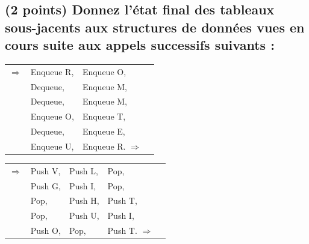 \documentclass[11pt,a4paper]{article}
\begin{document}
\bigskip
\bigskip


\subsection{(2 points) Donnez l'état final des tableaux sous-jacents aux structures de données vues en cours suite aux appels successifs suivants : }


\begin{center}
\begin{table}[ht!]
  \centering
  \begin{minipage}{0.45\textwidth}


\begin{center}
\begin{tabular}{ c L{2.5cm} L{2.5cm} c }
$\Rightarrow$
& Enqueue R, & Enqueue O, & \phantom{Iq} \\
& Dequeue,   & Enqueue M, & \phantom{Iq} \\
& Dequeue,   & Enqueue M, & \phantom{Iq} \\
& Enqueue O, & Enqueue T, & \phantom{Iq} \\
& Dequeue,   & Enqueue E, & \phantom{Iq} \\
& Enqueue U, & Enqueue R. $\Rightarrow$ & \phantom{Iq} \\
\end{tabular}
\end{center}

  \end{minipage}
  \hfillx
  \begin{minipage}{0.01\textwidth}


  \end{minipage}
  \hfillx
  \begin{minipage}{0.45\textwidth}


\begin{center}
\begin{tabular}{ c L{2cm} L{2cm} L{2cm} c }
$\Rightarrow$ & Push V, & Push L, & Pop,     & \phantom{Iq} \\
& Push G, & Push I, & Pop,     & \phantom{Iq} \\
& Pop,    & Push H, & Push T,  & \phantom{Iq} \\
& Pop,    & Push U, & Push I,  & \phantom{Iq} \\
& Push O, & Pop,    & Push T. $\Rightarrow$ & \phantom{Iq} \\
\end{tabular}
\end{center}

  \end{minipage}
\end{table}
\end{center}
\end{document}
